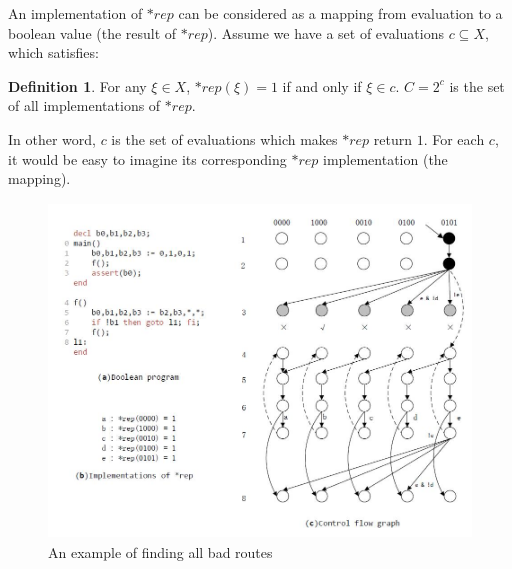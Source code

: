 \documentclass[10pt,journal,final,]{article}
\theoremstyle{definition}
\newtheorem{definition}{Definition}[section]
\begin{document}
An implementation of $*rep$ can be considered as a mapping from evaluation to a boolean value (the result of $*rep$). Assume we have a set of evaluations $c \subseteq X$, which satisfies:
\begin{definition}
For any $\xi \in X$, $*rep(\xi) = 1$ if and only if $\xi \in c$. $C = 2^{c}$ is the set of all implementations of $*rep$.
\end{definition}
In other word, $c$ is the set of evaluations which makes $*rep$ return $1$. For each $c$, it would be easy to imagine its corresponding $*rep$ implementation (the mapping).

\begin{figure}
\centering
\includegraphics[width=5in,height=3.5in]{Fig3-2.jpg}
\caption{An example of finding all bad routes}
\label{fig:FBR}
\end{figure}
\end{document}
